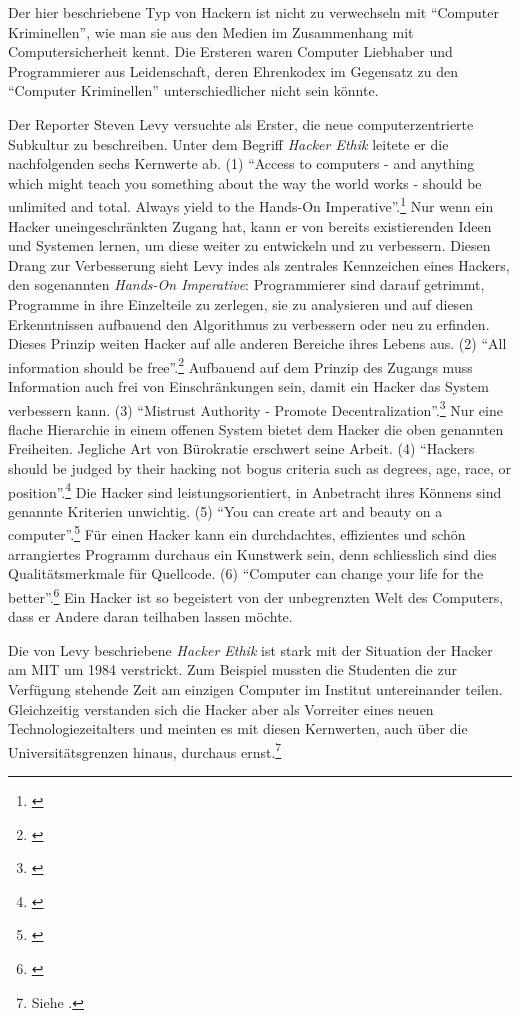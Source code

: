 \documentclass[
paper=164mm:234mm, %
pagesize, %
DIV=calc, %
10pt, %
BCOR=0mm, %
parskip=half- %
]{scrbook}
\begin{document}
Der hier beschriebene Typ von Hackern ist nicht zu verwechseln mit \enquote{Computer Kriminellen}, wie man sie aus den Medien im Zusammenhang mit Computersicherheit kennt. Die Ersteren waren Computer Liebhaber und Programmierer aus Leidenschaft, deren  Ehrenkodex im Gegensatz zu den \enquote{Computer Kriminellen} unterschiedlicher nicht sein könnte.

Der Reporter Steven Levy versuchte als Erster, die neue computerzentrierte Subkultur zu beschreiben. Unter dem Begriff \emph{Hacker Ethik} leitete er die nachfolgenden sechs Kernwerte ab.
(1) \enquote{Access to computers - and anything which might teach you something about the way the world works - should be unlimited and total. Always yield to the Hands-On Imperative}.\footnote{\cite[27]{Levy:1984}} Nur wenn ein Hacker uneingeschränkten Zugang hat, kann er von bereits existierenden Ideen und Systemen lernen, um diese weiter zu entwickeln und zu verbessern. Diesen Drang zur Verbesserung sieht Levy indes als zentrales Kennzeichen eines Hackers, den sogenannten \emph{Hands-On Imperative}: Programmierer sind darauf getrimmt, Programme in ihre Einzelteile zu zerlegen, sie zu analysieren und auf diesen Erkenntnissen aufbauend den Algorithmus zu verbessern oder neu zu erfinden. Dieses Prinzip weiten Hacker auf alle anderen Bereiche ihres Lebens aus.
(2) \enquote{All information should be free}.\footnote{\cite[27]{Levy:1984}} Aufbauend auf dem Prinzip des Zugangs muss Information auch frei von Einschränkungen sein, damit ein Hacker das System verbessern kann.
(3) \enquote{Mistrust Authority - Promote Decentralization}.\footnote{\cite[28]{Levy:1984}} Nur eine flache Hierarchie in einem offenen System bietet dem Hacker die oben genannten Freiheiten. Jegliche Art von Bürokratie erschwert seine Arbeit.
(4) \enquote{Hackers should be judged by their hacking not bogus criteria such as degrees, age, race, or position}.\footnote{\cite[30]{Levy:1984}} Die Hacker sind leistungsorientiert, in Anbetracht ihres Könnens sind genannte Kriterien unwichtig.
(5) \enquote{You can create art and beauty on a computer}.\footnote{\cite[30]{Levy:1984}} Für einen Hacker kann ein durchdachtes, effizientes und schön arrangiertes Programm durchaus ein Kunstwerk sein, denn schliesslich sind dies Qualitätsmerkmale für Quellcode.
(6) \enquote{Computer can change your life for the better}.\footnote{\cite[33]{Levy:1984}} Ein Hacker ist so begeistert von der unbegrenzten Welt des Computers, dass er Andere daran teilhaben lassen möchte.

Die von Levy beschriebene \emph{Hacker Ethik} ist stark mit der Situation der Hacker am MIT um 1984 verstrickt. Zum Beispiel mussten die Studenten die zur Verfügung stehende Zeit am einzigen Computer im Institut untereinander teilen. Gleichzeitig verstanden sich die Hacker aber als Vorreiter eines neuen Technologiezeitalters und meinten es mit diesen Kernwerten, auch über die Universitätsgrenzen hinaus, durchaus ernst.\footnote{Siehe \cite[26-37]{Levy:1984}.}
\end{document}

